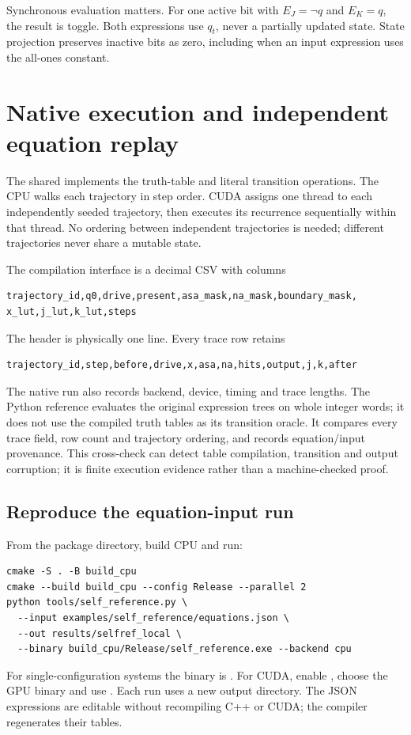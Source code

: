 Synchronous evaluation matters. For one active bit with $E_J=\neg q$ and
$E_K=q$, the result is toggle. Both expressions use $q_t$, never a partially
updated state. State projection preserves inactive bits as zero, including when
an input expression uses the all-ones constant.
\clearpage

\section{Native execution and independent equation replay}
The shared  implements the truth-table and
literal transition operations. The CPU walks each trajectory in step order.
CUDA assigns one thread to each independently seeded trajectory, then executes
its recurrence sequentially within that thread. No ordering between independent
trajectories is needed; different trajectories never share a mutable state.

The compilation interface is a decimal CSV with columns
\begin{lstlisting}
trajectory_id,q0,drive,present,asa_mask,na_mask,boundary_mask,
x_lut,j_lut,k_lut,steps
\end{lstlisting}
The header is physically one line. Every trace row retains
\begin{lstlisting}
trajectory_id,step,before,drive,x,asa,na,hits,output,j,k,after
\end{lstlisting}
The native run also records backend, device, timing and trace lengths. The
Python reference evaluates the original expression trees on whole integer words;
it does not use the compiled truth tables as its transition oracle. It compares
every trace field, row count and trajectory ordering, and records equation/input
provenance. This cross-check can detect table compilation, transition and output
corruption; it is finite execution evidence rather than a machine-checked proof.

\subsection{Reproduce the equation-input run}
From the package directory, build CPU and run:
\begin{lstlisting}
cmake -S . -B build_cpu
cmake --build build_cpu --config Release --parallel 2
python tools/self_reference.py \
  --input examples/self_reference/equations.json \
  --out results/selfref_local \
  --binary build_cpu/Release/self_reference.exe --backend cpu
\end{lstlisting}
For single-configuration systems the binary is .
For CUDA, enable \code{SATNAV\_ENABLE\_CUDA=ON}, choose the GPU binary and use
. Each run uses a new output directory. The JSON expressions
are editable without recompiling C++ or CUDA; the compiler regenerates their tables.

